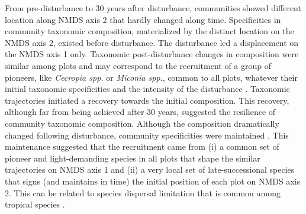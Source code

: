 \documentclass[fleqn,10pt]{ArtEcoFoG} %
\begin{document}
\color{red}From pre-disturbance to 30 years after disturbance,
communities showed different location along NMDS axis 2 that hardly
changed along time. Specificities in community taxonomic composition,
materialized by the distinct location on the NMDS axis 2, existed before
disturbance. The disturbance led a displacement on the NMDS axis 1
only.\color{black} Taxonomic \color{red} post-disturbance \color{black}
changes in composition were similar among plots and may correspond to
the recruitment of a group of pioneers, like \emph{Cecropia spp.} or
\emph{Miconia spp.}, common to all plots, whatever their initial
taxonomic \color{red}specificities \color{black} and the intensity of
the disturbance \citep{Denslow2000, Bongers2009}. Taxonomic trajectories
initiated a recovery towards the initial composition. This recovery,
although far from being achieved after 30 years, suggested the
resilience of community taxonomic composition. \color{red}Although the
composition dramatically changed following disturbance, community
specificities were maintained \citep{Folke2006}. This maintenance
suggested that the recruitment came from (i) a common set of pioneer and
light-demanding species in all plots that shape the similar trajectories
on NMDS axis 1 and (ii) a very local set of late-successional species
that signs (and maintains in time) the initial position of each plot on
NMDS axis 2. This can be related to species dispersal limitation that is
common among tropical species \citep{Svenning2005}.\color{black}
\end{document}
